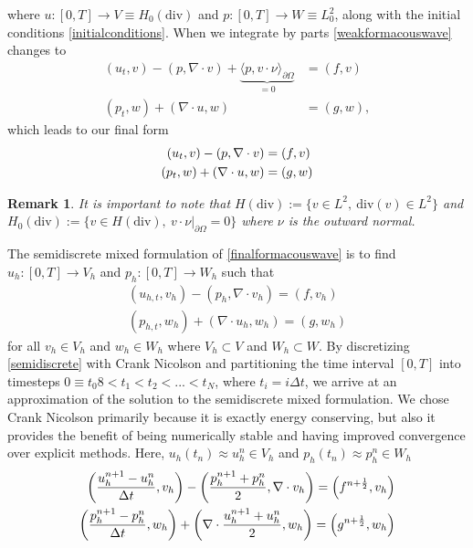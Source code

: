 \documentclass[11pt]{article}
\newtheorem{remark}{Remark}[section]
\newcommand{\divv}{\mathrm{div}}
\begin{document}
where $u:[0,T] \rightarrow V \equiv H_0(\divv)$ and $p:[0,T] \rightarrow W \equiv L_0^2$, along with the initial conditions \eqref{initialconditions}.
When we integrate by parts \eqref{weakformacouswave} changes to 
\begin{equation}
\begin{split}
(u_t,v) - (p,\nabla \cdot v) + \underbrace{\langle p, v \cdot \nu \rangle_{\partial\Omega}}_{=0} &= (f,v) \\
(p_t, w) + (\nabla \cdot u,w) &= (g,w),
\end{split}
\end{equation}
which leads to our final form 
\begin{equation}{\label{finalformacouswave}}
\begin{split}
(u_t,v) - (p,\nabla \cdot v) &= (f,v)\\
(p_t, w) + (\nabla \cdot u,w) &= (g,w)
\end{split}
\end{equation}
\begin{remark}
	It is important to note that $H(\divv):= \{v \in L^2,\: \divv(v) \in L^2\}$ and $H_0(\divv) := \{ v\in H(\divv),\: v \cdot \nu|_{\partial \Omega} = 0 \}$ where $\nu$ is the outward normal.
\end{remark}
The semidiscrete mixed formulation of \eqref{finalformacouswave} is to find $u_h:[0,T] \rightarrow V_h$ and $p_h:[0,T] \rightarrow W_h$ such that
\begin{equation}\label{semidiscrete}
\begin{split}
(u_{h,t},v_h) - (p_h,\nabla \cdot v_h) = (f,v_h)\\
(p_{h,t}, w_h) + (\nabla \cdot u_h,w_h) = (g,w_h)
\end{split}
\end{equation}
for all $v_h \in V_h$ and $w_h \in W_h$ where $V_h \subset V$ and $W_h \subset W$.
By discretizing \eqref{semidiscrete} with Crank Nicolson and partitioning the time interval $[0,T]$ into timesteps $0 \equiv t_0 8< t_1 < t_2 < ... < t_N$, where $t_i = i\Delta t$, we arrive at an approximation of the solution to the semidiscrete mixed formulation. We chose Crank Nicolson primarily because it is exactly energy conserving, but also it provides the benefit of being numerically stable and having improved convergence over explicit methods. Here, $u_h(t_n) \approx u^n_h \in V_h$ and $p_h(t_n) \approx p^n_h \in W_h$
\begin{equation}{\label{cnacoustic}}
\begin{split}
\left(\frac{u^{n+1}_h-u^n_h}{\Delta t},v_h\right)-\left(\frac{p^{n+1}_h+p^n_h}{2},\nabla \cdot v_h\right) = \left(f^{n+\frac{1}{2}},v_h\right) \\
\left(\frac{p^{n+1}_h-p^n_h}{\Delta t},w_h\right)+\left(\nabla \cdot \frac{u^{n+1}_h+u^n_h}{2},w_h\right) = \left(g^{n+\frac{1}{2}},w_h\right)
\end{split}
\end{equation}
\end{document}
